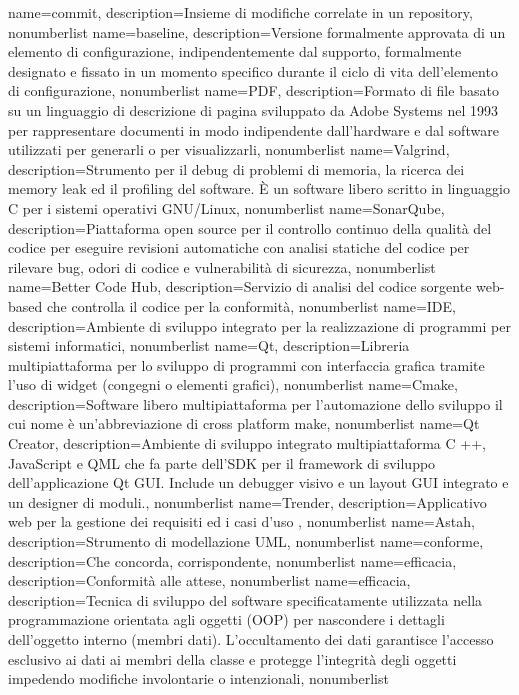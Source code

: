 {
	name={commit},
	description={Insieme di modifiche correlate in un repository},
	nonumberlist
}
{
	name={baseline},
	description={Versione formalmente approvata di un elemento di configurazione, indipendentemente dal supporto, formalmente designato e fissato in un momento specifico durante il ciclo di vita dell'elemento di configurazione},
	nonumberlist
}
{
	name={PDF},
	description={Formato di file basato su un linguaggio di descrizione di pagina sviluppato da Adobe Systems nel 1993 per rappresentare documenti in modo indipendente dall'hardware e dal software utilizzati per generarli o per visualizzarli},
	nonumberlist
}
{
	name={Valgrind},
	description={Strumento per il debug di problemi di memoria, la ricerca dei memory leak ed il profiling del software. È un software libero scritto in linguaggio C per i sistemi operativi GNU/Linux},
	nonumberlist
}
{
	name={SonarQube},
	description={Piattaforma open source per il controllo continuo della qualità del codice per eseguire revisioni automatiche con analisi statiche del codice per rilevare bug, odori di codice e vulnerabilità di sicurezza},
	nonumberlist
}
{
	name={Better Code Hub},
	description={Servizio di analisi del codice sorgente web-based che controlla il codice per la conformità},
	nonumberlist
}
{
	name={IDE},
	description={Ambiente di sviluppo integrato per la realizzazione di programmi per sistemi informatici},
	nonumberlist
}
{
	name={Qt},
	description={Libreria multipiattaforma per lo sviluppo di programmi con interfaccia grafica tramite l'uso di widget (congegni o elementi grafici)},
	nonumberlist
}
{
	name={Cmake},
	description={Software libero multipiattaforma per l'automazione dello sviluppo il cui nome è un'abbreviazione di cross platform make},
	nonumberlist
}
{
	name={Qt Creator},
	description={Ambiente di sviluppo integrato multipiattaforma C ++, JavaScript e QML che fa parte dell'SDK per il framework di sviluppo dell'applicazione Qt GUI. Include un debugger visivo e un layout GUI integrato e un designer di moduli.},
	nonumberlist
}
{
	name={Trender},
	description={Applicativo web per la gestione dei requisiti ed i casi d'uso },
	nonumberlist
}
{
	name={Astah},
	description={Strumento di modellazione UML},
	nonumberlist
}
{
	name={conforme},
	description={Che concorda, corrispondente},
	nonumberlist
}
{
	name={efficacia},
	description={Conformità alle attese},
	nonumberlist
}
{
	name={efficacia},
	description={Tecnica di sviluppo del software specificatamente utilizzata nella programmazione orientata agli oggetti (OOP) per nascondere i dettagli dell'oggetto interno (membri dati). L'occultamento dei dati garantisce l'accesso esclusivo ai dati ai membri della classe e protegge l'integrità degli oggetti impedendo modifiche involontarie o intenzionali},
	nonumberlist
}

